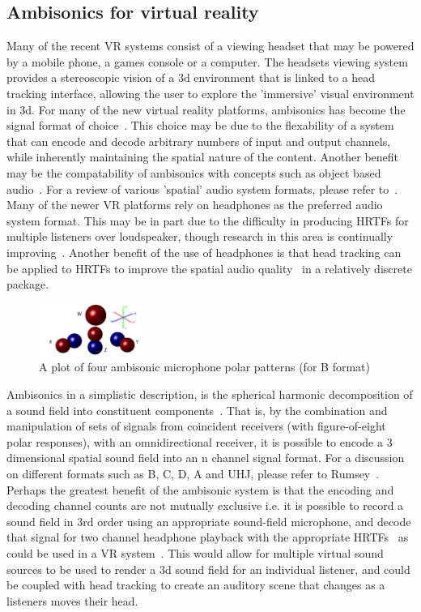 \documentclass[paper=a4, fontsize=10pt, font=arial]{scrartcl} %
\numberwithin{equation}{section} %
\numberwithin{figure}{section} %
\numberwithin{table}{section} %
\begin{document}
\subsection{Ambisonics for virtual reality}

Many of the recent VR systems consist of a viewing headset that may be powered by a mobile phone, a games console or a computer. The headsets viewing system provides a stereoscopic vision of a 3d environment that is linked to a head tracking interface, allowing the user to explore the 'immersive' visual environment in 3d. For many of the new virtual reality platforms, ambisonics has become the signal format of choice~\cite{googlevr2016}. This choice may be due to the flexability of a system that can encode and decode arbitrary numbers of input and output channels, while inherently maintaining the spatial nature of the content.
Another benefit may be the compatability of ambisonics with concepts such as object based audio~\cite{Pike2016}. For a review of various 'spatial' audio system formats, please refer to~\cite{Wiggins2004}. Many of the newer VR platforms rely on headphones as the preferred audio system format. This may be in part due to the difficulty in producing HRTFs for multiple listeners over loudspeaker, though research in this area is continually improving~\cite{Galvez2016}. Another benefit of the use of headphones is that head tracking can be applied to HRTFs to improve the spatial audio quality~\cite{Inanaga1995} in a relatively discrete package.\\

\begin{figure}[H]
\centering
\includegraphics[width=0.3\textwidth]{ambisonicmicpatterns.jpg}
\centering
\caption{A plot of four ambisonic microphone polar patterns (for B format)~\cite{Wiggins2004}}
\end{figure}

Ambisonics in a simplistic description, is the spherical harmonic decomposition of a sound field into constituent components~\cite{rumsey2012spatial}. 
That is, by the combination and manipulation of  sets of signals from coincident receivers (with figure-of-eight polar responses), with an omnidirectional receiver, it is possible to encode a 3 dimensional spatial sound field into an n channel signal format. 
For a discussion on different formats such as B, C, D, A and UHJ, please refer to Rumsey~\cite{rumsey2012spatial}. 
Perhaps the greatest benefit of the ambisonic system is that the encoding and decoding channel counts are not mutually exclusive i.e. it is possible to record a sound field in 3rd order using an appropriate sound-field microphone, and decode that signal for two channel headphone playback with the appropriate HRTFs~\cite{Jot1998} as could be used in a VR system~\cite{Collins2013}. This would allow for multiple virtual sound sources to be used to render a 3d sound field for an individual listener, and could be coupled with head tracking to create an auditory scene that changes as a listeners moves their head.\
\end{document}
